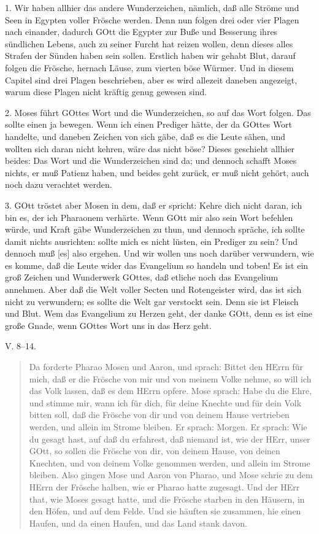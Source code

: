 1. Wir haben allhier das andere Wunderzeichen, nämlich, daß alle Ströme und Seen in Egypten voller Frösche werden. Denn nun folgen drei oder vier Plagen nach einander, dadurch GOtt die Egypter zur Buße und Besserung ihres sündlichen Lebens, auch zu seiner Furcht hat reizen wollen, denn dieses alles Strafen der Sünden haben sein sollen. Erstlich haben wir gehabt Blut, darauf folgen die Frösche, hernach Läuse, zum vierten böse Würmer. Und in diesem Capitel sind drei Plagen beschrieben, aber es wird allezeit daneben angezeigt, warum diese Plagen nicht kräftig genug gewesen sind.

2. Moses führt GOttes Wort und die Wunderzeichen, so auf das Wort folgen. Das sollte einen ja bewegen. Wenn ich einen Prediger hätte, der da GOttes Wort handelte, und daneben Zeichen von sich gäbe, daß es die Leute sähen, und wollten sich daran nicht kehren, wäre das nicht böse? Dieses geschieht allhier beides: Das Wort und die Wunderzeichen sind da; und dennoch schafft Moses nichts, er muß Patienz haben, und beides geht zurück, er muß nicht gehört, auch noch dazu verachtet werden.

3. GOtt tröstet aber Mosen in dem, daß er spricht: Kehre dich nicht daran, ich bin es, der ich Pharaonem verhärte. Wenn GOtt mir also sein Wort befehlen würde, und Kraft gäbe Wunderzeichen zu thun, und dennoch spräche, ich sollte damit nichts ausrichten: sollte mich es nicht lüsten, ein Prediger zu sein? Und dennoch muß [es] also ergehen. Und wir wollen uns noch darüber verwundern, wie es komme, daß die Leute wider das Evangelium so handeln und toben! Es ist ein groß Zeichen und Wunderwerk GOttes, daß etliche noch das Evangelium annehmen. Aber daß die Welt voller Secten und Rotengeister wird, das ist sich nicht zu verwundern; es sollte die Welt gar verstockt sein. Denn sie ist Fleisch und Blut. Wem das Evangelium zu Herzen geht, der danke GOtt, denn es ist eine große Gnade, wenn GOttes Wort uns in das Herz geht.

\begin{schriftzitat}
V. 8–14.
\end{schriftzitat}

\begin{quote}
Da forderte Pharao Mosen und Aaron, und sprach: Bittet den HErrn für mich, daß er die Frösche von mir und von meinem Volke nehme, so will ich das Volk lassen, daß es dem HErrn opfere. Mose sprach: Habe du die Ehre, und stimme mir, wann ich für dich, für deine Knechte und für dein Volk bitten soll, daß die Frösche von dir und von deinem Hause vertrieben werden, und allein im Strome bleiben. Er sprach: Morgen. Er sprach: Wie du gesagt hast, auf daß du erfahrest, daß niemand ist, wie der HErr, unser GOtt, so sollen die Frösche von dir, von deinem Hause, von deinen Knechten, und von deinem Volke genommen werden, und allein im Strome bleiben. Also gingen Mose und Aaron von Pharao, und Mose schrie zu dem HErrn der Frösche halben, wie er Pharao hatte zugesagt. Und der HErr that, wie Moses gesagt hatte, und die Frösche starben in den Häusern, in den Höfen, und auf dem Felde. Und sie häuften sie zusammen, hie einen Haufen, und da einen Haufen, und das Land stank davon.
\end{quote}

